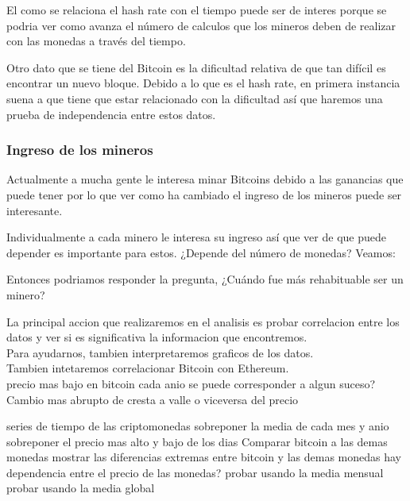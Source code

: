 \documentclass[12pt,letterpaper]{article}
\begin{document}
    El como se relaciona el hash rate con el tiempo puede ser de interes porque se podria ver como avanza el número de calculos que los mineros deben de realizar con las monedas a través del tiempo.



   Otro dato que se tiene del Bitcoin es la dificultad relativa de que tan difícil es encontrar un nuevo bloque. Debido a lo que es el hash rate, en primera instancia suena a que tiene que estar relacionado con la dificultad así que haremos una prueba de independencia entre estos datos. 

   \subsubsection*{Ingreso de los mineros}

    Actualmente a mucha gente le interesa minar Bitcoins debido a las ganancias que puede tener por lo que ver como ha cambiado el ingreso de los mineros puede ser interesante.


    Individualmente a cada minero le interesa su ingreso así que ver de que puede depender es importante para estos. ¿Depende del número de monedas? Veamos:


    
    Entonces podriamos responder la pregunta, ¿Cuándo fue más rehabituable ser un minero?








    La principal accion que realizaremos en el analisis es probar correlacion entre los datos y ver si es significativa la informacion que encontremos.
    \\
    Para ayudarnos, tambien interpretaremos graficos de los datos.
    \\
    Tambien intetaremos correlacionar Bitcoin con Ethereum.
    \\
    precio mas bajo en bitcoin cada anio
        se puede corresponder a algun suceso?
    Cambio mas abrupto de cresta a valle o viceversa del precio

    series de tiempo de las criptomonedas
        sobreponer la media de cada mes y anio
    sobreponer el precio mas alto y bajo de los dias
    Comparar bitcoin a las demas monedas
        mostrar las diferencias extremas entre bitcoin y las demas monedas
    hay dependencia entre el precio de las monedas?
        probar usando la media mensual
        probar usando la media global
\end{document}

